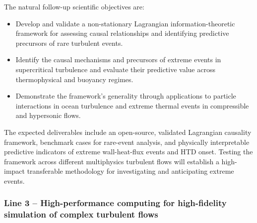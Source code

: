 \documentclass[11pt]{article}
\newcommand{\NEW}[1]{\iffinal #1\else{\color{red}#1}\fi}
\begin{document}
The natural follow-up scientific objectives are:
\begin{itemize}
	\item[\textbf{O4.}] Develop and validate a non-stationary Lagrangian information-theoretic framework for assessing causal relationships and identifying predictive precursors of rare turbulent events.
	\item[\textbf{O5.}] Identify the causal mechanisms and precursors of extreme events in supercritical turbulence and evaluate their predictive value across thermophysical and buoyancy regimes.
	\item[\textbf{O6.}] Demonstrate the framework's generality through applications to particle interactions in ocean turbulence and extreme thermal events in compressible and hypersonic flows.
\end{itemize}
The expected deliverables include an open-source, validated Lagrangian causality framework, benchmark cases for rare-event analysis, and physically interpretable predictive indicators of extreme wall-heat-flux events and HTD onset.
\NEW{Testing the framework} across different multiphysics turbulent flows will establish a high-impact transferable methodology for investigating and anticipating extreme events.

\subsubsection{Line 3 -- High-performance computing for high-fidelity simulation of complex turbulent flows}
\end{document}
